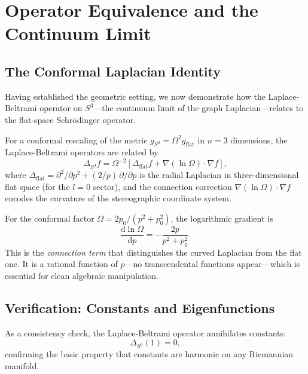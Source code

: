 \documentclass[aps,pra,twocolumn,superscriptaddress,longbibliography]{revtex4-2}
\begin{document}
\section{Operator Equivalence and the Continuum Limit}
\label{sec:operator}

\subsection{The Conformal Laplacian Identity}

Having established the geometric setting, we now demonstrate how the Laplace-Beltrami operator on $S^3$---the continuum limit of the graph Laplacian---relates to the flat-space Schr\"odinger operator.

For a conformal rescaling of the metric $g_{S^3} = \Omega^2 g_{\text{flat}}$ in $n = 3$ dimensions, the Laplace-Beltrami operators are related by
\begin{equation}
\Delta_{S^3} f = \Omega^{-2}\left[\Delta_{\text{flat}} f + \nabla(\ln\Omega) \cdot \nabla f\right],
\label{eq:conformal_laplacian}
\end{equation}
where $\Delta_{\text{flat}} = \partial^2/\partial p^2 + (2/p)\,\partial/\partial p$ is the radial Laplacian in three-dimensional flat space (for the $l = 0$ sector), and the connection correction $\nabla(\ln\Omega) \cdot \nabla f$ encodes the curvature of the stereographic coordinate system.

For the conformal factor $\Omega = 2p_0/(p^2 + p_0^2)$, the logarithmic gradient is
\begin{equation}
\frac{\mathrm{d} \ln\Omega}{\mathrm{d}p} = -\frac{2p}{p^2 + p_0^2}.
\label{eq:connection}
\end{equation}
This is the \textit{connection term} that distinguishes the curved Laplacian from the flat one. It is a rational function of $p$---no transcendental functions appear---which is essential for clean algebraic manipulation.

\subsection{Verification: Constants and Eigenfunctions}

As a consistency check, the Laplace-Beltrami operator annihilates constants:
\begin{equation}
\Delta_{S^3}(1) = 0,
\end{equation}
confirming the basic property that constants are harmonic on any Riemannian manifold.
\end{document}
